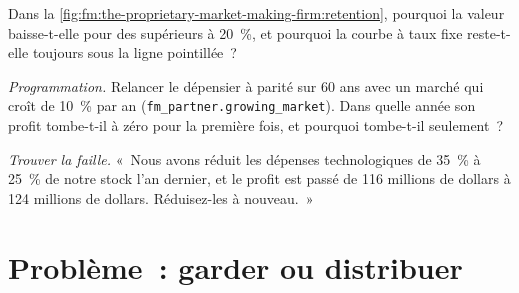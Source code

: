 \begin{exercise}[$\star\star$]\label{exo:fm:the-proprietary-market-making-firm:6}
Dans la \cref{fig:fm:the-proprietary-market-making-firm:retention}, pourquoi la valeur baisse-t-elle pour des  supérieurs à 20~\%, et pourquoi la courbe à taux fixe
reste-t-elle toujours sous la ligne pointillée~?
\end{exercise}

\begin{exercise}[$\star\star\star$]\label{exo:fm:the-proprietary-market-making-firm:7}
\emph{Programmation.} Relancer le dépensier à parité sur 60 ans avec un marché qui croît de 10~\% par an (\texttt{fm\_partner.growing\_market}). Dans quelle année son profit tombe-t-il
à zéro pour la première fois, et pourquoi tombe-t-il seulement~?
\end{exercise}

\begin{exercise}[$\star\star\star$]\label{exo:fm:the-proprietary-market-making-firm:8}
\emph{Trouver la faille.} «~Nous avons réduit les dépenses technologiques de 35~\% à 25~\% de notre stock l'an dernier, et le profit est passé de 116 millions de dollars à 124 millions de dollars.
Réduisez-les à nouveau.~»
\end{exercise}

\section{Problème~: garder ou distribuer}

